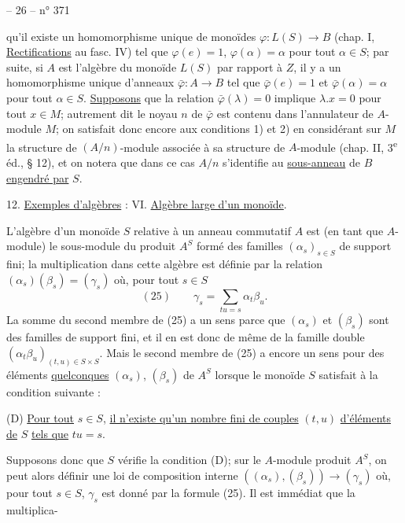\begin{center}-- 26 -- \hfill n° 371\end{center}
qu'il existe un homomorphisme unique de monoïdes $\varphi:L(S)\to B$ (chap. I, \uline{Rectifications} au fasc. IV) tel que $\varphi(e)=1$, $\varphi(\alpha)=\alpha$ pour tout $\alpha\in S$; par suite, si $A$ est l'algèbre du monoïde $L(S)$ par rapport à $Z$, il y a un homomorphisme unique d'anneaux $\bar\varphi:A\to B$ tel que $\bar\varphi(e)=1$ et $\bar\varphi(\alpha)=\alpha$ pour tout $\alpha\in S$. \uline{Supposons} que la relation $\bar\varphi(\lambda)=0$ implique $\lambda.x=0$ pour tout $x\in M$; autrement dit le noyau $n$ de $\bar\varphi$ est contenu dans l'annulateur de $A$-module $M$; on satisfait donc encore aux conditions 1) et 2) en considérant sur $M$ la structure de $(A/n)$-module associée à sa structure de $A$-module (chap. II, 3\textsuperscript{e} éd., § 12), et on notera que dans ce cas $A/n$ s'identifie au \uline{sous-anneau} de $B$ \uline{engendré par} $S$.

12. \uline{Exemples d'algèbres} : VI. \uline{Algèbre large d'un monoïde}.

L'algèbre d'un monoïde $S$ relative à un anneau commutatif $A$ est (en tant que $A$-module) le sous-module du produit $A^S$ formé des familles $(\alpha_s)_{s\in S}$ de support fini; la multiplication dans cette algèbre est définie par la relation $(\alpha_s)(\beta_s)=(\gamma_s)$ où, pour tout $s\in S$
\[
(25)\qquad \gamma_s=\sum_{tu=s}\alpha_t\beta_u.
\]
La somme du second membre de (25) a un sens parce que $(\alpha_s)$ et $(\beta_s)$ sont des familles de support fini, et il en est donc de même de la famille double $(\alpha_t\beta_u)_{(t,u)\in S\times S}$. Mais le second membre de (25) a encore un sens pour des éléments \uline{quelconques} $(\alpha_s)$, $(\beta_s)$ de $A^S$ lorsque le monoïde $S$ satisfait à la condition suivante :

(D) \uline{Pour tout} $s\in S$, \uline{il n'existe qu'un nombre fini de couples} $(t,u)$ \uline{d'éléments de} $S$ \uline{tels que} $tu=s$.

Supposons donc que $S$ vérifie la condition (D); sur le $A$-module produit $A^S$, on peut alors définir une loi de composition interne $((\alpha_s),(\beta_s))\to(\gamma_s)$ où, pour tout $s\in S$, $\gamma_s$ est donné par la formule (25). Il est immédiat que la multiplica-
